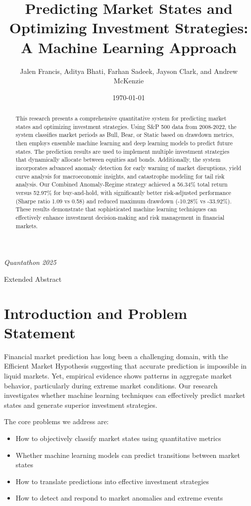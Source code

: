 \documentclass[10pt]{article}
\title{Predicting Market States and Optimizing Investment Strategies: \\
A Machine Learning Approach}
\author{Jalen Francis, Aditya Bhati, Farhan Sadeek, Jayson Clark, and Andrew McKenzie}
\date{\today}
\makeatletter
\renewcommand{\maketitle}{%
    \begin{center}
        \vspace*{0.5cm}
        \Large\@title
        
        \vspace{0.4cm}
        \large\@author
        
        \vspace{0.5cm}
        \normalsize\textit{Quantathon 2025}
        
        \vspace{0.3cm}
        \normalsize Extended Abstract
        \vspace{0.5cm}
    \end{center}
}
\makeatother
\begin{document}
\maketitle

\begin{abstract}
    This research presents a comprehensive quantitative system for predicting market states and optimizing investment strategies. Using S\&P 500 data from 2008-2022, the system classifies market periods as Bull, Bear, or Static based on drawdown metrics, then employs ensemble machine learning and deep learning models to predict future states. The prediction results are used to implement multiple investment strategies that dynamically allocate between equities and bonds. Additionally, the system incorporates advanced anomaly detection for early warning of market disruptions, yield curve analysis for macroeconomic insights, and catastrophe modeling for tail risk analysis. Our Combined Anomaly-Regime strategy achieved a 56.34\% total return versus 52.97\% for buy-and-hold, with significantly better risk-adjusted performance (Sharpe ratio 1.09 vs 0.58) and reduced maximum drawdown (-10.28\% vs -33.92\%). These results demonstrate that sophisticated machine learning techniques can effectively enhance investment decision-making and risk management in financial markets.
\end{abstract}

\section{Introduction and Problem Statement}
Financial market prediction has long been a challenging domain, with the Efficient Market Hypothesis suggesting that accurate prediction is impossible in liquid markets. Yet, empirical evidence shows patterns in aggregate market behavior, particularly during extreme market conditions. Our research investigates whether machine learning techniques can effectively predict market states and generate superior investment strategies.

The core problems we address are:
\begin{itemize}
    \item How to objectively classify market states using quantitative metrics
    \item Whether machine learning models can predict transitions between market states
    \item How to translate predictions into effective investment strategies
    \item How to detect and respond to market anomalies and extreme events
\end{itemize}
\end{document}
